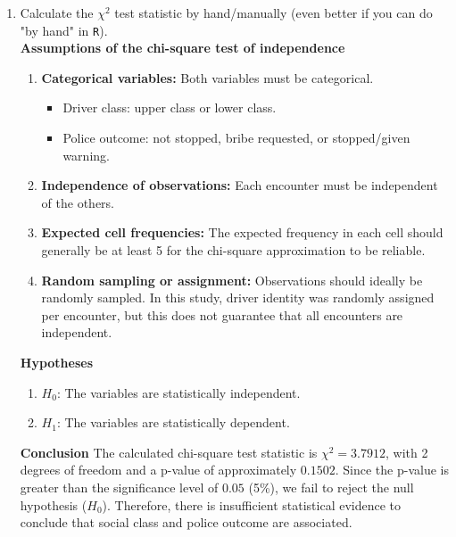 \documentclass[12pt,letterpaper]{article}
\begin{document}
\begin{enumerate}
	
\item [(a)] Calculate the $\chi^2$ test statistic by hand/manually (even better if you can do "by hand" in \texttt{R}).\\
{\large \textbf{Assumptions of the chi-square test of independence}}

\begin{enumerate}
	\item \textbf{Categorical variables:} Both variables must be categorical.
	\begin{itemize}
		\item Driver class: upper class or lower class.
		\item Police outcome: not stopped, bribe requested, or stopped/given warning.
	\end{itemize}
	
	\item \textbf{Independence of observations:} Each encounter must be independent of the others.
	
	\item \textbf{Expected cell frequencies:} The expected frequency in each cell should generally be at least 5 for the chi-square approximation to be reliable.
	
	\item \textbf{Random sampling or assignment:} Observations should ideally be randomly sampled. In this study, driver identity was randomly assigned per encounter, but this does not guarantee that all encounters are independent.
\end{enumerate}

{\large \textbf{Hypotheses}}

\begin{enumerate}
	\item $H_0$: The variables are statistically independent.
	\item $H_1$: The variables are statistically dependent.
\end{enumerate}



{\large \textbf{Conclusion}}
The calculated chi-square test statistic is $\chi^2 = 3.7912$,
with 2 degrees of freedom and a p-value of approximately $0.1502$.
Since the p-value is greater than the significance level of $0.05$
(5\%), we fail to reject the null hypothesis ($H_0$).
Therefore, there is insufficient statistical evidence to conclude
that social class and police outcome are associated.


\end{enumerate}
\end{document}
